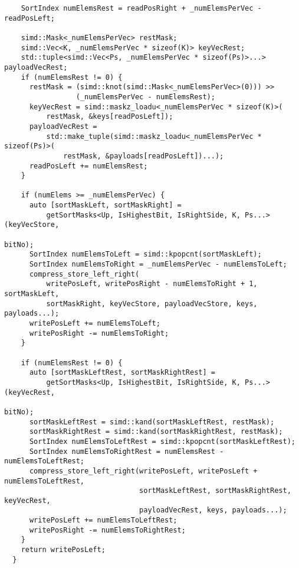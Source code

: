 \documentclass[12pt, a4paper, openright, twoside]{tiarbeit}
\begin{document}
\begin{verbatim}
    SortIndex numElemsRest = readPosRight + _numElemsPerVec - readPosLeft;

    simd::Mask<_numElemsPerVec> restMask;
    simd::Vec<K, _numElemsPerVec * sizeof(K)> keyVecRest;
    std::tuple<simd::Vec<Ps, _numElemsPerVec * sizeof(Ps)>...> payloadVecRest;
    if (numElemsRest != 0) {
      restMask = (simd::knot(simd::Mask<_numElemsPerVec>(0))) >>
                 (_numElemsPerVec - numElemsRest);
      keyVecRest = simd::maskz_loadu<_numElemsPerVec * sizeof(K)>(
          restMask, &keys[readPosLeft]);
      payloadVecRest =
          std::make_tuple(simd::maskz_loadu<_numElemsPerVec * sizeof(Ps)>(
              restMask, &payloads[readPosLeft])...);
      readPosLeft += numElemsRest;
    }

    if (numElems >= _numElemsPerVec) {
      auto [sortMaskLeft, sortMaskRight] =
          getSortMasks<Up, IsHighestBit, IsRightSide, K, Ps...>(keyVecStore,
                                                                bitNo);
      SortIndex numElemsToLeft = simd::kpopcnt(sortMaskLeft);
      SortIndex numElemsToRight = _numElemsPerVec - numElemsToLeft;
      compress_store_left_right(
          writePosLeft, writePosRight - numElemsToRight + 1, sortMaskLeft,
          sortMaskRight, keyVecStore, payloadVecStore, keys, payloads...);
      writePosLeft += numElemsToLeft;
      writePosRight -= numElemsToRight;
    }

    if (numElemsRest != 0) {
      auto [sortMaskLeftRest, sortMaskRightRest] =
          getSortMasks<Up, IsHighestBit, IsRightSide, K, Ps...>(keyVecRest,
                                                                bitNo);
      sortMaskLeftRest = simd::kand(sortMaskLeftRest, restMask);
      sortMaskRightRest = simd::kand(sortMaskRightRest, restMask);
      SortIndex numElemsToLeftRest = simd::kpopcnt(sortMaskLeftRest);
      SortIndex numElemsToRightRest = numElemsRest - numElemsToLeftRest;
      compress_store_left_right(writePosLeft, writePosLeft + numElemsToLeftRest,
                                sortMaskLeftRest, sortMaskRightRest, keyVecRest,
                                payloadVecRest, keys, payloads...);
      writePosLeft += numElemsToLeftRest;
      writePosRight -= numElemsToRightRest;
    }
    return writePosLeft;
  }


\end{verbatim}
\end{document}
